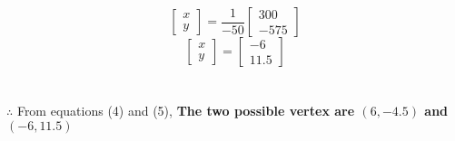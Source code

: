 \documentclass[journal,12pt,twocolumn]{IEEEtran}
\begin{document}
\[
\begin{bmatrix}
x \\ y
\end{bmatrix}
=
\frac{1}{-50}
\begin{bmatrix}
300 \\ -575
\end{bmatrix}
\]
\begin{equation}
\begin{bmatrix}
x \\ y
\end{bmatrix}
=
\begin{bmatrix}
-6 \\ 11.5
\end{bmatrix}
\end{equation}
\\\\
\noindent
$\therefore$ From equations (4) and (5), \textbf{The two possible vertex are $(6,-4.5)$ and $(-6,11.5)$}
\end{document}
